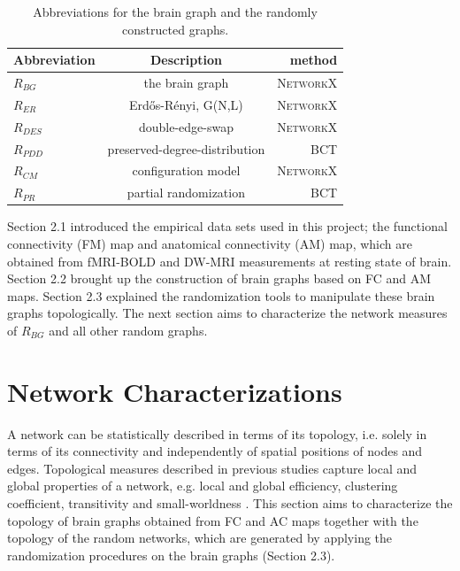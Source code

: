 \begin{table}[h]
\begin{center}
\caption[Abbreviations of Randomization Methods]{Abbreviations for the brain graph and the randomly constructed graphs. }
\begin{tabular}{ l | c | r }
  Abbreviation & Description & method \\
  \hline  \hline                     
  $R_{BG}$ & the brain graph               & \textsc{NetworkX} \citep{XYZNETW} \\ \hline
  $R_{ER}$ & Erd\H{o}s-R\'{e}nyi, G(N,L)   & \textsc{NetworkX} \citep{XYZNETW}\\ \hline
  $R_{DES}$ & double-edge-swap             & \textsc{NetworkX}\citep{XYZNETW} \\ \hline
  $R_{PDD}$ & preserved-degree-distribution& \textsc{BCT} \citep{XYZBCT}	 \\ \hline  
  $R_{CM}$ & configuration model       	   & \textsc{NetworkX} \citep{XYZNETW} \\ \hline
  $R_{PR}$ & partial randomization         & \textsc{BCT} \citep{XYZBCT}	 \\ \hline  
  \hline  
\end{tabular}
\label{table:Abbreviations of Randomization Methods}
\end{center}
\end{table}	

Section 2.1 introduced the empirical data sets used in this project; the functional connectivity (FM) map and anatomical connectivity (AM) map, which are obtained from fMRI-BOLD and DW-MRI measurements at resting state of brain. Section 2.2 brought up the construction of brain graphs based on FC and AM maps. Section 2.3 explained the randomization tools to manipulate these brain graphs topologically. The next section aims to characterize the network measures of $R_{BG}$ and all other random graphs.

\section{Network Characterizations}


A network can be statistically described in terms of its topology, i.e. solely in terms of its connectivity and independently of spatial positions of nodes and edges. Topological measures described in previous studies capture local and global properties of a network, e.g. local and global efficiency, clustering coefficient, transitivity and small-worldness \citep{LAT01, WAT98, NEW03, HUM08}. This section aims to characterize the topology of brain graphs obtained from FC and AC maps together with the topology of the random networks, which are generated by applying the randomization procedures on the brain graphs (Section 2.3).   



